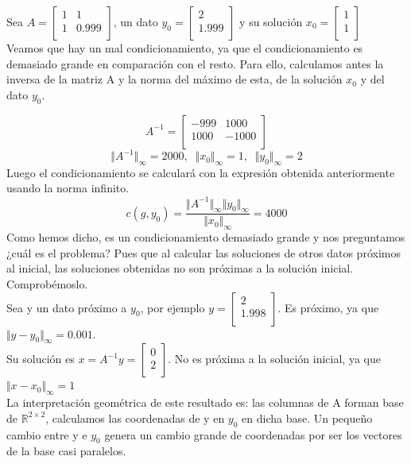 \begin{ejemplo}
Sea $A = \begin{bmatrix}
1 & 1 \\
1 & 0.999 \\
\end{bmatrix}$,
un dato $y_0 = \begin{bmatrix}
2 \\
1.999 \\
\end{bmatrix}$
y su solución $x_0 = \begin{bmatrix}
1 \\
1 \\
\end{bmatrix}$\\

Veamos que hay un mal condicionamiento, ya que el condicionamiento es demasiado grande en comparación con el resto. Para ello, calculamos antes la inversa de la matriz A y la norma del máximo de esta, de la solución $x_0$ y del dato $y_0$.

\[ A^{-1} = \begin{bmatrix}
-999 & 1000 \\
1000 & -1000 \\
\end{bmatrix} \]
\[ \Vert A^{-1} \Vert _\infty = 2000, \; \; \Vert x_0 \Vert _\infty = 1, \; \; \Vert y_0 \Vert _\infty = 2 \]
Luego el condicionamiento se calculará con la expresión obtenida anteriormente usando la norma infinito.
\[ c(g, y_0) = \frac{\Vert A^{-1} \Vert _\infty \Vert y_0 \Vert _\infty }{\Vert x_0 \Vert _\infty } = 4000 \]
Como hemos dicho, es un condicionamiento demasiado grande y nos preguntamos ¿cuál es el problema? Pues que al calcular las soluciones de otros datos próximos al inicial, las soluciones obtenidas no son próximas a la solución inicial. Comprobémoslo.\\
Sea y un dato próximo a $y_0$, por ejemplo $y = \begin{bmatrix}
2 \\
1.998 \\
\end{bmatrix}$.
Es próximo, ya que $\Vert y - y_0 \Vert _\infty = 0.001$.\\
Su solución es $x = A^{-1}y = \begin{bmatrix}
0 \\
2 \\
\end{bmatrix}$. No es próxima a la solución inicial, ya que $\Vert x - x_0 \Vert _\infty = 1$\\
La interpretación geométrica de este resultado es: las columnas de A forman base de $\mathbb{R}^{2 \times 2}$, calculamos las coordenadas de y en $y_0$ en dicha base. Un pequeño cambio entre y e $y_0$ genera un cambio grande de coordenadas por ser los vectores de la base casi paralelos.
\end{ejemplo}


